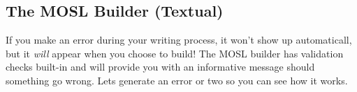 \newpage
\texHeader

\subsection{ The MOSL Builder (Textual)}

\hypertarget{validation tex}{}If you make an error during your writing process, it won't show up automaticall, but it \emph{will} appear when you choose to build! The MOSL builder has validation checks built-in and will provide you with an informative message should something go wrong. Lets generate an error or two so you can see how it works.



